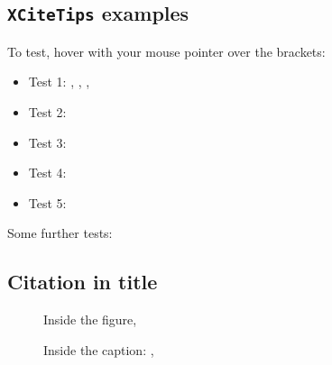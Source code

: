 \documentclass[11pt,a4paper,twocolumn]{article}
\begin{document}
\subsection*{\texttt{XCiteTips} examples
\cite[using refs:][]{Einstein:1916vd,Misner:1974qy,Wigner:1939cj}}

To test, hover with your mouse pointer over the brackets:

\begin{itemize}
  \item Test 1: 
    \cite{Einstein:1916vd}, \cite{Misner:1974qy}, \cite{Wigner:1939cj}, 
    \cite{Weinberg:1995mt}
  \item Test 2: 
    \cite{York:1972sj,Gibbons:1976ue,Hawking:1995fd}
  \item Test 3: 
    \cite[post]{Misner:1974qy,Wigner:1939cj,Hawking:1995fd}
  \item Test 4: 
    \cite[pre][post]{Schmidt-May:2015vnx,Hinterbichler:2011tt,deRham:2014zqa}
  \item Test 5: 
    \cite[pre][]{Rosen:1975kk,Isham:1971gm}
\end{itemize}

\noindent Some further tests:

\subsection*{Citation \cite{Aragone:1971kh,Chamseddine:1978yu,Damour:2002ws} 
in title}

\begin{figure}[H]
  Inside the figure, \cite{Einstein:1916vd} 
  \caption{Inside the caption: \cite{Einstein:1916vd} 
  , 
  \cite{Misner:1974qy,Wigner:1939cj,Weinberg:1995mt}}
\end{figure}



\end{document}
